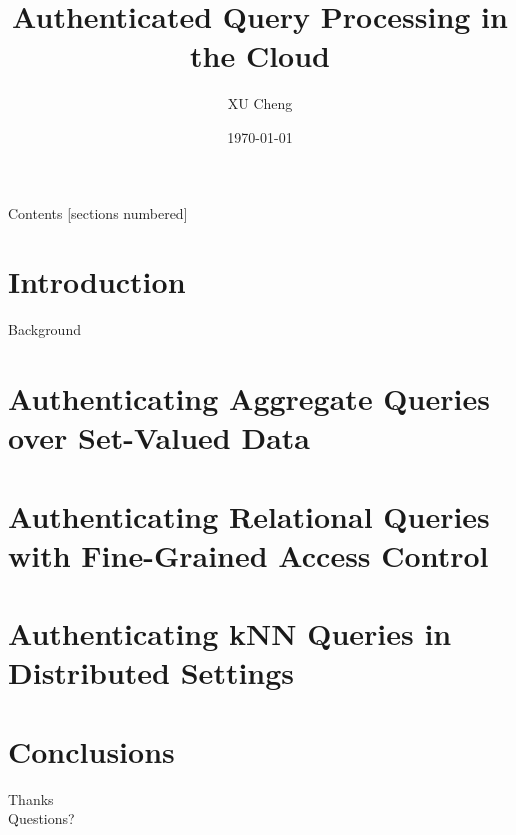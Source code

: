 \documentclass[xcolor={dvipsnames},aspectratio=169,10pt]{beamer}
\title{Authenticated Query Processing in the Cloud}
\author{XU Cheng}
\institute{Supervisor: Prof.~XU Jianliang}
\date{\today}
\begin{document}
\maketitle%

\begin{frame}{Contents}
  [sections numbered]
  \tableofcontents[hideallsubsections]
\end{frame}

\section{Introduction}

\begin{frame}{Background}
\end{frame}

\section{Authenticating Aggregate Queries over Set-Valued Data}

\section{Authenticating Relational Queries with Fine-Grained Access Control}

\section{Authenticating {kNN} Queries in Distributed Settings}

\section{Conclusions}

\begin{frame}[standout]
  Thanks \\
  Questions?
\end{frame}
\end{document}
